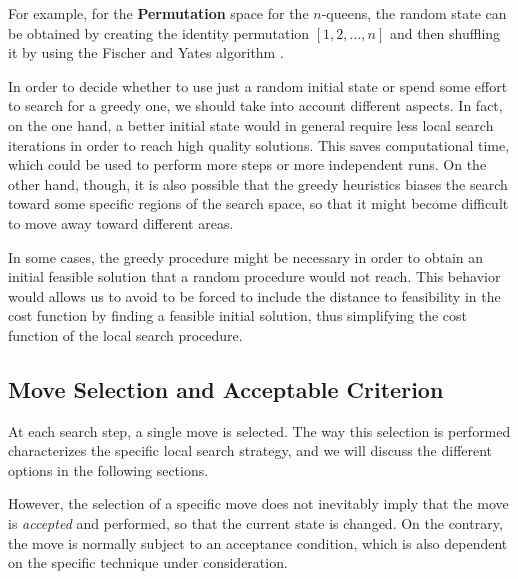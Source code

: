 For example, for the \textbf{Permutation} space for the $n$-queens, the
random state can be obtained by creating the identity permutation
$[1,2,\dots,n]$ and then shuffling it by using the Fischer
and Yates algorithm \cite{FiYa38}.


In order to decide whether to use just a random initial state or spend
some effort to search for a greedy one, we should take into account
different aspects. In fact, on the one hand, a better initial state
would in general require less local search iterations in order to reach
high quality solutions. This saves computational time, which could be used
to perform more steps or more independent runs. On the other hand,
though, it is also possible that the greedy heuristics biases the
search toward some specific regions of the search space, so that it
might become difficult to move away toward different areas.

In some cases, the greedy procedure might be necessary in order to
obtain an initial feasible solution that a random procedure would not
reach. This behavior would allows us to avoid to be forced to include
the distance to feasibility in the cost function by finding a feasible
initial solution, thus simplifying the cost function of the local
search procedure.




\subsection{Move Selection and Acceptable Criterion}

At each search step, a single move is selected. The way this selection is
performed characterizes the specific local search strategy, and we
will discuss the different options in the following sections.

However, the selection of a specific move does not inevitably imply that
the move is \emph{accepted} and performed, so that the current state is changed. On
the contrary, the move is normally subject to an acceptance condition,
which is also dependent on the specific technique under consideration.

